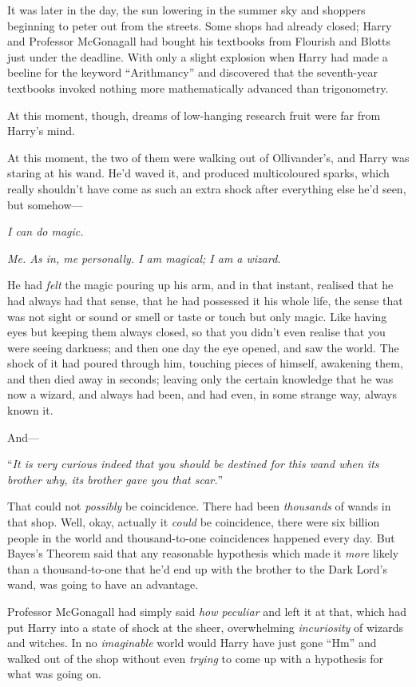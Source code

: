 \later

It was later in the day, the sun lowering in the summer sky and shoppers beginning to peter out from the streets. Some shops had already closed; Harry and Professor McGonagall had bought his textbooks from Flourish and Blotts just under the deadline. With only a slight explosion when Harry had made a beeline for the keyword “Arithmancy” and discovered that the seventh-year textbooks invoked nothing more mathematically advanced than trigonometry.

At this moment, though, dreams of low-hanging research fruit were far from Harry’s mind.

At this moment, the two of them were walking out of Ollivander’s, and Harry was staring at his wand. He’d waved it, and produced multicoloured sparks, which really shouldn’t have come as such an extra shock after everything else he’d seen, but somehow—

\emph{I can do magic.}

\emph{Me. As in, me personally. I am magical; I am a wizard.}

He had \emph{felt} the magic pouring up his arm, and in that instant, realised that he had always had that sense, that he had possessed it his whole life, the sense that was not sight or sound or smell or taste or touch but only magic. Like having eyes but keeping them always closed, so that you didn’t even realise that you were seeing darkness; and then one day the eye opened, and saw the world. The shock of it had poured through him, touching pieces of himself, awakening them, and then died away in seconds; leaving only the certain knowledge that he was now a wizard, and always had been, and had even, in some strange way, always known it.

And—

“\emph{It is very curious indeed that you should be destined for this wand when its brother why, its brother gave you that scar.}”

That could not \emph{possibly} be coincidence. There had been \emph{thousands} of wands in that shop. Well, okay, actually it \emph{could} be coincidence, there were six billion people in the world and thousand-to-one coincidences happened every day. But Bayes’s Theorem said that any reasonable hypothesis which made it \emph{more} likely than a thousand-to-one that he’d end up with the brother to the Dark Lord’s wand, was going to have an advantage.

Professor McGonagall had simply said \emph{how peculiar} and left it at that, which had put Harry into a state of shock at the sheer, overwhelming \emph{incuriosity} of wizards and witches. In no \emph{imaginable} world would Harry have just gone “Hm” and walked out of the shop without even \emph{trying} to come up with a hypothesis for what was going on.


